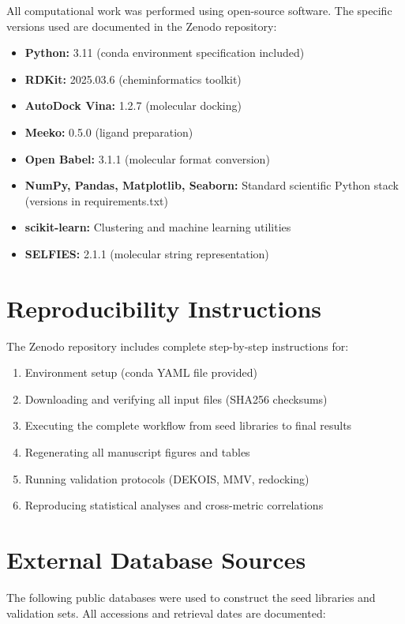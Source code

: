 \documentclass[11pt,a4paper]{article}
\begin{document}
All computational work was performed using open-source software. The specific versions used are documented in the Zenodo repository:

\begin{itemize}[leftmargin=*]
\item \textbf{Python:} 3.11 (conda environment specification included)
\item \textbf{RDKit:} 2025.03.6 (cheminformatics toolkit)
\item \textbf{AutoDock Vina:} 1.2.7 (molecular docking)
\item \textbf{Meeko:} 0.5.0 (ligand preparation)
\item \textbf{Open Babel:} 3.1.1 (molecular format conversion)
\item \textbf{NumPy, Pandas, Matplotlib, Seaborn:} Standard scientific Python stack (versions in requirements.txt)
\item \textbf{scikit-learn:} Clustering and machine learning utilities
\item \textbf{SELFIES:} 2.1.1 (molecular string representation)
\end{itemize}

\section*{Reproducibility Instructions}

The Zenodo repository includes complete step-by-step instructions for:

\begin{enumerate}[leftmargin=*]
\item Environment setup (conda YAML file provided)
\item Downloading and verifying all input files (SHA256 checksums)
\item Executing the complete workflow from seed libraries to final results
\item Regenerating all manuscript figures and tables
\item Running validation protocols (DEKOIS, MMV, redocking)
\item Reproducing statistical analyses and cross-metric correlations
\end{enumerate}

\section*{External Database Sources}

The following public databases were used to construct the seed libraries and validation sets. All accessions and retrieval dates are documented:
\end{document}
